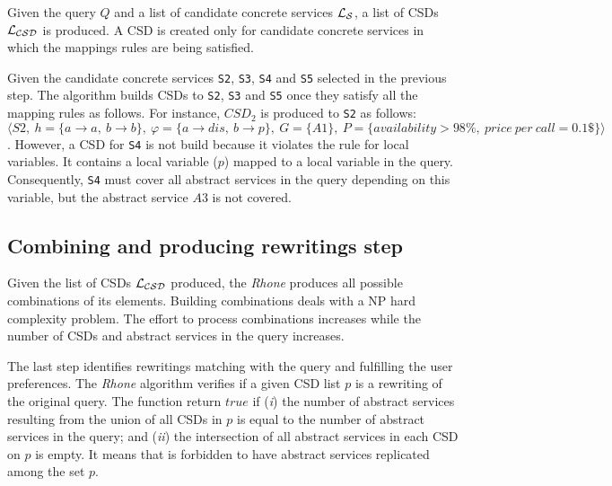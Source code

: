 Given the query $Q$ and a list of candidate concrete services $\hbox{${\cal L_{S}}$}$, a list of CSDs $\hbox{${\cal L_{CSD}}$}$ is produced. A  CSD is created only for candidate concrete services in which the mappings rules are being satisfied.

Given the candidate concrete services \texttt{S2}, \texttt{S3}, \texttt{S4} and \texttt{S5} selected in the previous step. The algorithm builds CSDs to \texttt{S2}, \texttt{S3} and \texttt{S5} once they satisfy all the mapping rules as follows.
For instance, $CSD_{2}$ is produced to \texttt{S2} as follows: 
$\langle S2, \ h = \lbrace a \rightarrow a, \ b \rightarrow b \rbrace, \ \varphi = \lbrace a \rightarrow dis, \ b \rightarrow p \rbrace, \ G = \lbrace A1 \rbrace, \ P = \lbrace availability > 98\%, \ price \ per \ call = 0.1\$ \rbrace \rangle$. However, a CSD for \texttt{S4} is not build because it violates the rule for local variables. It contains a local variable ($p$) mapped to a local variable in the query. Consequently, \texttt{S4} must cover all abstract services in the query depending on this variable, but the abstract service $A3$ is not covered.

\subsection{Combining and producing rewritings step}
Given the list of CSDs $\hbox{${\cal L_{CSD}}$}$ produced, the \textit{Rhone} produces all possible combinations of its elements. 
Building combinations deals with a NP hard complexity problem.
The effort to process combinations increases while the number of CSDs and abstract services in the query increases.

The last step identifies rewritings matching with the query and fulfilling the user preferences.
The \textit{Rhone} algorithm verifies if a given CSD list $p$ is a rewriting
of the original query.
The function return $true$ if (\textit{i}) the number of
abstract services resulting from the union of all CSDs in $p$ is equal to
the number of abstract services in the query; and (\textit{ii}) the intersection
of all abstract services in each CSD on $p$ is empty.
It means that is forbidden to have abstract services replicated among the set $p$.

